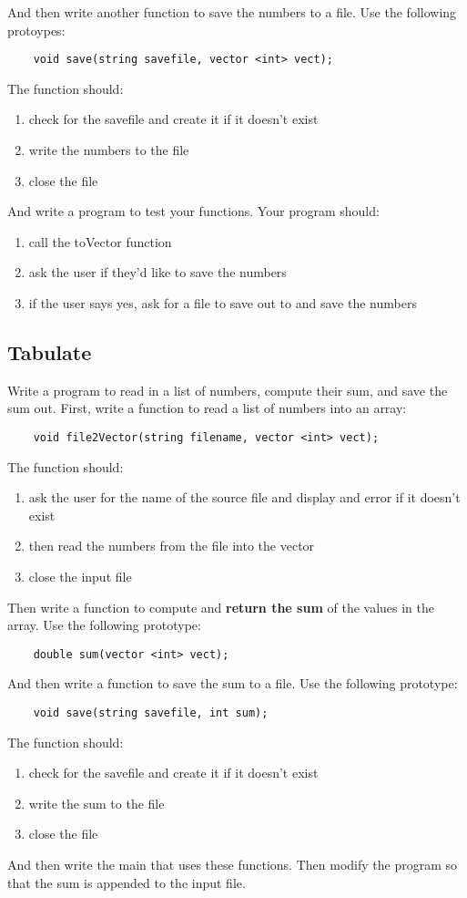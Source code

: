 \documentclass{article}
\begin{document}
 And then write another function to save the numbers to a file. Use the following protoypes:
\begin{verbatim}
	void save(string savefile, vector <int> vect);
\end{verbatim}
The function should:
\begin{enumerate}
	\item check for the savefile and create it if it doesn't exist
	\item write the numbers to the file
	\item close the file
\end{enumerate}
And write a program to test your functions. Your program should:
\begin{enumerate}
	\item call the toVector function
	\item ask the user if they'd like to save the numbers
	\item if the user says yes, ask for a file to save out to and save the numbers
\end{enumerate}

\subsection{Tabulate}
Write a program to read in a list of numbers, compute their sum, and save the sum out. First, write a function to read a list of numbers into an array:
\begin{verbatim}
	void file2Vector(string filename, vector <int> vect);
\end{verbatim}
The function should:
\begin{enumerate}
	\item ask the user for the name of the source file and display and error if it doesn't exist
	\item then read the numbers from the file into the vector
	\item close the input file
\end{enumerate}
Then write a function to compute and \textbf{return the sum} of the values in the array. Use the following prototype:
\begin{lstlisting}
	double sum(vector <int> vect);
\end{lstlisting}
And then write a function to save the sum to a file. Use the following prototype:
\begin{verbatim}
	void save(string savefile, int sum);
\end{verbatim}
The function should:
\begin{enumerate}
	\item check for the savefile and create it if it doesn't exist
	\item write the sum to the file
	\item close the file
\end{enumerate}
And then write the main that uses these functions. 
Then modify the program so that the sum is appended to the input file.
\end{document}
